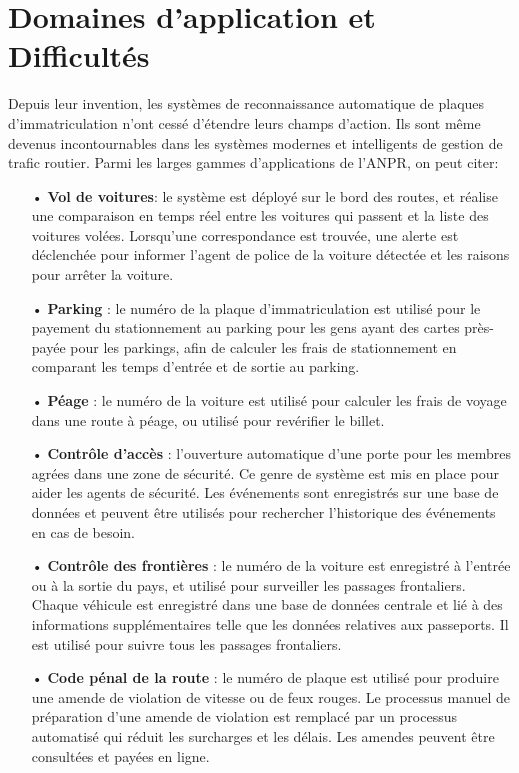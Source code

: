 \section{Domaines d'application et Difficultés}
Depuis leur invention, les systèmes de reconnaissance automatique de plaques d’immatriculation n’ont cessé d’étendre leurs champs d’action. Ils sont même devenus incontournables dans les systèmes modernes et intelligents de gestion de trafic routier. Parmi les larges gammes d’applications de l’ANPR, on peut citer: 
    \begin{itemize}
        \item[•]\textbf{Vol de voitures}: le système est déployé sur le bord des routes, et réalise une comparaison en temps réel entre les voitures qui passent et la liste des voitures volées. Lorsqu’une correspondance est trouvée, une alerte est déclenchée pour informer l’agent de police de la voiture détectée et les raisons pour arrêter la voiture.
        \item[•]\textbf{Parking} : le numéro de la plaque d’immatriculation est utilisé pour le payement du stationnement au parking pour les gens ayant des cartes près-payée pour les parkings, afin de calculer les frais de stationnement en comparant les temps d’entrée et de sortie au parking.
        \item[•]\textbf{Péage} : le numéro de la voiture est utilisé pour calculer les frais de voyage dans une route à péage, ou utilisé pour revérifier le billet.
        \item[•]\textbf{Contrôle d’accès} : l’ouverture automatique d’une porte pour les membres agrées dans une zone de sécurité. Ce genre de système est mis en place pour aider les agents de sécurité. Les événements sont enregistrés sur une base de données et peuvent être utilisés pour rechercher l’historique des événements en cas de besoin.
        \item[•]\textbf{Contrôle des frontières} : le numéro de la voiture est enregistré à l’entrée ou à la sortie du pays, et utilisé pour surveiller les passages frontaliers. Chaque véhicule est enregistré dans une base de données centrale et lié à des informations supplémentaires telle que les données relatives aux passeports. Il est utilisé pour suivre tous les passages frontaliers.
        \item[•]\textbf{Code pénal de la route} : le numéro de plaque est utilisé pour produire une amende de violation de vitesse ou de feux rouges. Le processus manuel de préparation d’une amende de violation
        est remplacé par un processus automatisé qui réduit les surcharges et les délais. Les amendes peuvent être consultées et payées en ligne. \cite{HindeThesis}         
    \end{itemize} \par
